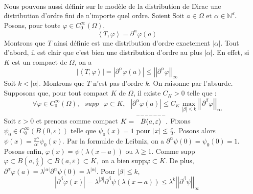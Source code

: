 \documentclass[3pt]{article}
\begin{document}
~\newline

Nous pouvons aussi d\'{e}finir sur le mod\`{e}le de la distribution de Dirac
une distribution d'ordre fini de n'importe quel ordre. Soient Soit $a\in
\Omega $ et $\alpha \in \mathbb{N}^{d}$. Posons, pour toute $\varphi \in
C_{0}^{\infty }(\Omega ),$%
\begin{equation*}
\left\langle T,\varphi \right\rangle =\partial ^{\alpha }\varphi (a)
\end{equation*}%
Montrons que $T$ ainsi d\'{e}finie est une distribution d'ordre exactement $%
\left\vert \alpha \right\vert .$ Tout d'abord, il est clair que c'est bien
une distribution d'ordre au plus $\left\vert \alpha \right\vert $. En effet,
si $K$ est un compact de $\Omega $, on a%
\begin{equation*}
\left\vert \left\langle T,\varphi \right\rangle \right\vert =\left\vert
\partial ^{\alpha }\varphi (a)\right\vert \leq \left\vert \left\vert
\partial ^{\alpha }\varphi \right\vert \right\vert _{\infty }
\end{equation*}%
Soit $k<\left\vert \alpha \right\vert $. Montrons que $T$ n'est pas d'ordre $%
k$. On raisonne par l'absurde. Supposons que, pour tout compact $K$ de $%
\Omega $, il existe $C_{K}>0$ telle que :%
\begin{equation*}
\forall \varphi \in C_{0}^{\infty }(\Omega ),\text{ }supp\text{ }\varphi
\subset K,\text{ }\left\vert \partial ^{\alpha }\varphi (a)\right\vert \leq
C_{K}\underset{\left\vert \beta \right\vert \leq k}{\max }\left\vert
\left\vert \partial ^{\beta }\varphi \right\vert \right\vert _{\infty }
\end{equation*}%
Soit $\varepsilon >0$ et prenons comme compact $K=\overset{-------}{%
B(a,\varepsilon )}.$ Fixons $\psi _{0}\in C_{0}^{\infty }(B(0,\varepsilon ))$
telle que $\psi _{0}(x)=1$ pour $\left\vert x\right\vert \leq \frac{%
\varepsilon }{2}.$ Posons alors $\psi (x)=\frac{x^{\alpha }}{\alpha !}\psi
_{0}(x).$ Par la formulde de Leibniz, on a $\partial ^{\alpha }\psi (0)=\psi
_{0}(0)=1.$ Posons enfin, $\varphi (x)=\psi (\lambda (x-a))$ ou $\lambda
\geq 1.$ Comme supp$\varphi \subset B\left( a,\frac{\epsilon }{\lambda }%
\right) \subset B\left( a,\varepsilon \right) \subset K,$ on a bien supp$%
\varphi \subset K.$ De plus, $\partial ^{\alpha }\varphi (a)=\lambda
^{\left\vert \alpha \right\vert }\partial ^{\alpha }\psi (0)=\lambda
^{\left\vert \alpha \right\vert }.$ Pour $\left\vert \beta \right\vert \leq
k,$%
\begin{equation*}
\left\vert \partial ^{\beta }\varphi (x)\right\vert =\lambda ^{\left\vert
\beta \right\vert }\partial ^{\beta }\psi (\lambda (x-a))\leq \lambda
^{k}\left\vert \left\vert \partial ^{\beta }\psi \right\vert \right\vert
_{\infty }
\end{equation*}%
\end{document}
